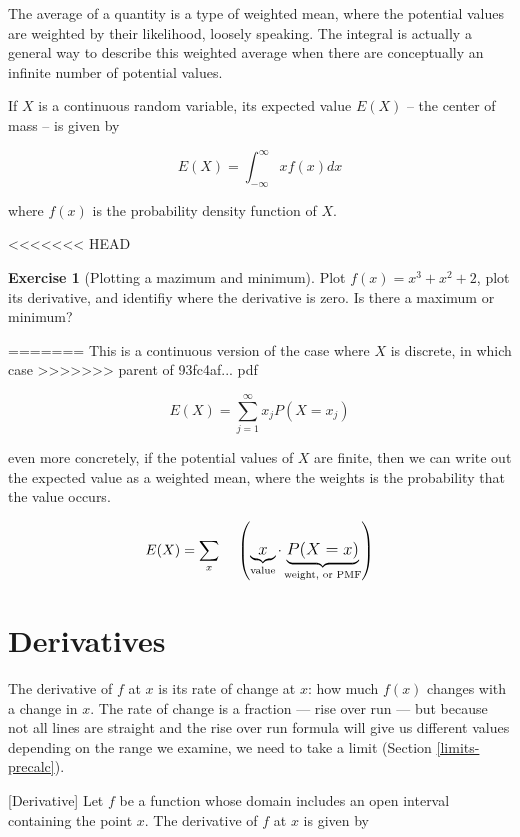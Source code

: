 \documentclass[]{book}
\theoremstyle{definition}
\theoremstyle{definition}
\theoremstyle{definition}
\newtheorem{exercise}{Exercise}[chapter]
\theoremstyle{remark}
\begin{document}
The average of a quantity is a type of weighted mean, where the potential values are weighted by their likelihood, loosely speaking. The integral is actually a general way to describe this weighted average when there are conceptually an infinite number of potential values.

If \(X\) is a continuous random variable, its expected value \(E(X)\) -- the center of mass -- is given by

\[E(X) = \int^{\infty}_{-\infty}x f(x) dx\]

where \(f(x)\) is the probability density function of \(X\).

<<<<<<< HEAD
\begin{exercise}[Plotting a mazimum and minimum]
\protect\hypertarget{exr:unnamed-chunk-44}{}{\label{exr:unnamed-chunk-44} {} }Plot \(f(x)=x^3+ x^2 + 2\), plot its derivative, and identifiy where the derivative is zero. Is there a maximum or minimum?
\end{exercise}
=======
This is a continuous version of the case where \(X\) is discrete, in which case
>>>>>>> parent of 93fc4af... pdf

\[E(X) = \sum^\infty_{j=1} x_j P(X = x_j)\]

even more concretely, if the potential values of \(X\) are finite, then we can write out the expected value as a weighted mean, where the weights is the probability that the value occurs.

\[E(X) = \large \sum_{x} \quad\left( \underbrace{x}_{\text{value}}\cdot \underbrace{P(X = x)}_{\text{weight, or PMF}}\right)\]

\hypertarget{derivintro}{%
\section{Derivatives}\label{derivintro}}

The derivative of \(f\) at \(x\) is its rate of change at \(x\): how much \(f(x)\) changes with a change in \(x\). The rate of change is a fraction --- rise over run --- but because not all lines are straight and the rise over run formula will give us different values depending on the range we examine, we need to take a limit (Section \ref{limits-precalc}).

[Derivative]
\protect\hypertarget{def:unnamed-chunk-15}{}{\label{def:unnamed-chunk-15} {} }Let \(f\) be a function whose domain includes an open interval containing the point \(x\). The derivative of \(f\) at \(x\) is given by
\end{document}
